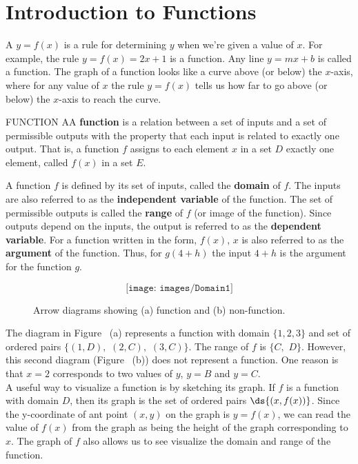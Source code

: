 \section{Introduction to Functions}\label{sec:Functions}
A  $y=f(x)$ is a rule for determining
$y$ when we're given a value of $x$.  For example, the rule
$y=f(x)=2x+1$ is a function.  Any line $y=mx+b$ is called a  
function.  The graph of a function looks like a curve 
above (or below) the $x$-axis, where for any value
of $x$ the rule $y=f(x)$ tells us how far to go above (or below) the
$x$-axis to reach the curve.

\begin{definition}{FUNCTION}
	AA {\bf{function}} is a relation between a set of inputs and a set of permissible outputs with the property that each input is related to exactly one output. That is, a function $f$ assigns to each element $x$ in a set $D$ exactly one element, called $f(x)$ in a set $E$.
\end{definition}	

A function $f$ is defined by its set of inputs, called the {\bf{domain}} of $f$. The inputs are also referred to as the {\bf{independent variable}} of the function. The set of permissible outputs is called the {\bf{range}} of $f$ (or image of the function). Since outputs depend on the inputs, the output is referred to as the {\bf{dependent variable}}. For a function written in the form, $\displaystyle{f(x)}$, $x$ is also referred to as the {\bf{argument}} of the function. Thus, for $g(4+h)$ the input $4+h$ is the argument for the function $g$.  \\


\begin{figure}[H]
	$$\texttt{[image: images/Domain1]}$$
	\caption{Arrow diagrams showing (a) function and (b) non-function. \label{fig:arrowDiagrams}} 
\end{figure}	

The diagram in Figure~ (a) represents a function with domain $\{1, 2, 3\}$ and set of ordered pairs $\{(1,D), \,\,(2,C), \,\,(3,C)\}$. The range of $f$ is $\{C, \,\,D\}$. However, this second diagram (Figure~ (b)) does not represent a function. One reason is that $x=2$ corresponds to two values of $y$, $y=B$ and $y=C$.  \\

A useful way to visualize a function is by sketching its graph. If $f$ is a function with domain $D$, then its graph is the set of ordered pairs $\ds{(x,f(x))}$. Since the y-coordinate of ant point $(x,y)$ on the graph is $y=f(x)$, we can read the value of $f(x)$ from the graph as being the height of the graph corresponding to $x$. The graph of $f$ also allows us to see visualize the domain and range of the function. \\




